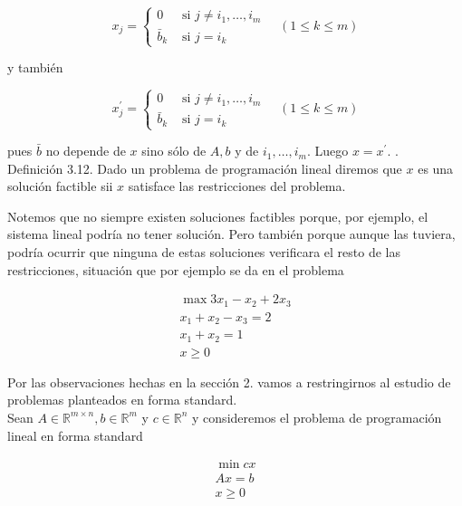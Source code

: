 \documentclass[10pt]{article}
\begin{document}
$$
x_{j}=\left\{\begin{array}{ll}
0 & \text { si } j \neq i_{1}, \ldots, i_{m} \\
\bar{b}_{k} & \text { si } j=i_{k}
\end{array} \quad(1 \leq k \leq m)\right.
$$

y también

$$
x_{j}^{\prime}=\left\{\begin{array}{ll}
0 & \text { si } j \neq i_{1}, \ldots, i_{m} \\
\bar{b}_{k} & \text { si } j=i_{k}
\end{array} \quad(1 \leq k \leq m)\right.
$$

pues $\bar{b}$ no depende de $x$ sino sólo de $A, b$ y de $i_{1}, \ldots, i_{m}$. Luego $x=x^{\prime}$. .\\
Definición 3.12. Dado un problema de programación lineal diremos que $x$ es una solución factible sii $x$ satisface las restricciones del problema.

Notemos que no siempre existen soluciones factibles porque, por ejemplo, el sistema lineal podría no tener solución. Pero también porque aunque las tuviera, podría ocurrir que ninguna de estas soluciones verificara el resto de las restricciones, situación que por ejemplo se da en el problema

$$
\begin{gathered}
\max 3 x_{1}-x_{2}+2 x_{3} \\
x_{1}+x_{2}-x_{3}=2 \\
x_{1}+x_{2}=1 \\
x \geq 0
\end{gathered}
$$

Por las observaciones hechas en la sección 2. vamos a restringirnos al estudio de problemas planteados en forma standard.\\
Sean $A \in \mathbb{R}^{m \times n}, b \in \mathbb{R}^{m}$ y $c \in \mathbb{R}^{n}$ y consideremos el problema de programación lineal en forma standard


\begin{gather*}
\min c x \\
A x=b  \tag{1}\\
x \geq 0
\end{gather*}
\end{document}
